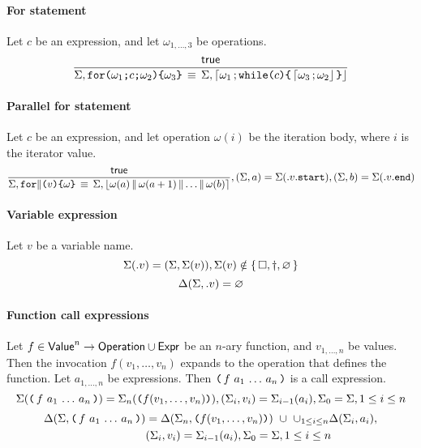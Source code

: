 \paragraph{For statement}
Let $c$ be an expression, and let $\omega_{1,\ldots,3}$ be operations.
$$
\semruleeq
        {\true}
        {\Sigma, \forstmt{\omega_1}{c}{\omega_2}{\omega_3}}
        {\Sigma, \stmt{\omega_1}{\whilestmt{c}{\stmt{\omega_3}{\omega_2}}}}
$$

\paragraph{Parallel for statement}
Let $c$ be an expression, and let operation $\omega(i)$ be the iteration body, where $i$ is the iterator value.
$$
\semruleeq
        {\true}
        {\Sigma, \parforstmt{v}{\omega}}
        {\Sigma, \parstmt
        	{\omega(a)}
        	{\omega(a+1)}
        	{\ldots}
        	{\omega(b)}},
        (\Sigma, a) = \Sigma(\val{\memb{v}{start}}),
        (\Sigma, b) = \Sigma(\val{\memb{v}{end}})
$$

\paragraph{Variable expression}
Let $v$ be a variable name.
$$
\Sigma({.}v) = (\Sigma, \Sigma(v)),
	\Sigma(v) \notin \left\{\,\Box, \dagger, \varnothing\,\right\}
$$
$$
\Delta(\Sigma, {.}v) = \varnothing
$$

\paragraph{Function call expressions}
Let $f \in \mathsf{Value}^n \to \mathsf{Operation} \cup \mathsf{Expr}$ be an $n$-ary function, and $v_{1, \ldots, n}$ be values.
Then the invocation $f(v_1, \ldots, v_n)$ expands to the operation that defines the function.
Let $a_{1, \ldots, n}$ be expressions.
Then $\opexp{f}{a_1}{\ldots}{a_n}$ is a call expression.
$$
\Sigma(\opexp{f}{a_1}{\ldots}{a_n}) = \Sigma_n(\ttlparen f(v_1, \ldots, v_n) \ttrparen),
	(\Sigma_i, v_i) = \Sigma_{i-1}(a_i),
		\Sigma_0 = \Sigma, 1 \le i \le n
$$
\begin{equation*}
\begin{split}
\Delta(\Sigma, \opexp{f}{a_1}{\ldots}{a_n}) &=
	\Delta(\Sigma_n, \ttlparen f(v_1, \ldots, v_n) \ttrparen) ~ \cup ~ \cup_{1 \le i \le n} \Delta(\Sigma_i, a_i), \\
	&(\Sigma_i, v_i) = \Sigma_{i-1}(a_i), \Sigma_0 = \Sigma, 1 \le i \le n
\end{split}
\end{equation*}

